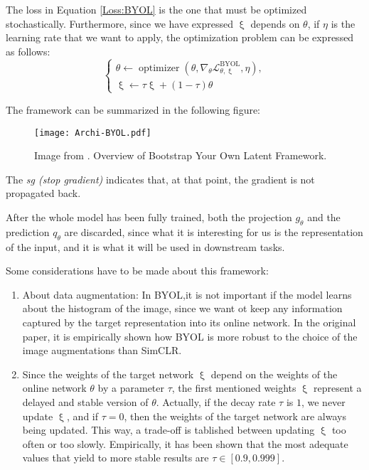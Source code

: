 The loss in Equation \eqref{Loss:BYOL} is the one that must be optimized stochastically. Furthermore, since we have expressed $\upxi$ depends on $\theta$, if $\eta$ is the learning rate that we want to apply, the optimization problem can be expressed as follows:
\[
\begin{cases}
    \theta \gets \operatorname{optimizer}\left(\theta,\nabla_\theta \mathcal L_{\theta,\upxi}^{\operatorname{BYOL}},\eta \right), \\
    \upxi \gets \tau \upxi + (1-\tau)\theta 
\end{cases}
\]

The framework can be summarized in the following figure:
\begin{figure}[H]
    \centering 
    \texttt{[image: Archi-BYOL.pdf]}
    \caption{Image from \citep{grill2020bootstrap}. Overview of Bootstrap Your Own Latent Framework. }
\end{figure}

The \emph{sg (stop gradient)} indicates that, at that point, the gradient is not propagated back. 

After the whole model has been fully trained, both the projection $g_\theta$  and the prediction $q_\theta$ are discarded, since what it is interesting for us is the representation of the input, and it is what it will be used in downstream tasks.

Some considerations have to be made about this framework:
\begin{enumerate}
    \item About data augmentation: In BYOL,it is not important if the model learns about the histogram of the image, since we want ot keep any information captured by the target representation into its online network. In the original paper, it is empirically shown how BYOL is more robust to the choice of the image augmentations than SimCLR.

    \item Since the weights of the target network $\upxi$ depend on the weights of the online network $\theta$ by a parameter $\tau$, the first mentioned weights $\upxi$ represent a delayed and stable version of $\theta$. Actually, if the decay rate $\tau$ is $1$, we never update $\upxi$, and if $\tau = 0 $, then the weights of the target network are always being updated. This way, a trade-off is tablished between updating $\upxi$ too often or too slowly. Empirically, it has been shown that the most adequate values that yield to more stable results are $\tau \in [0.9,0.999]$.
\end{enumerate}

